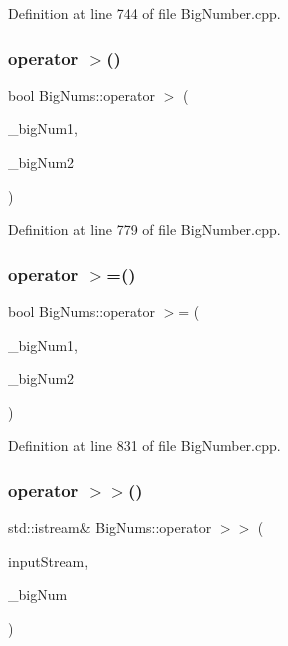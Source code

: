 Definition at line 744 of file Big\+Number.\+cpp.

\mbox{\label{namespace_big_nums_a8da493ab5dba979579d6ceeec7b1ac14}} 
\subsubsection{\texorpdfstring{operator $>$()}{operator >()}}
{\footnotesize\ttfamily bool Big\+Nums\+::operator $>$ (\begin{DoxyParamCaption}\item[{const \mbox{\hyperlink{class_big_nums_1_1_big_number}{Big\+Number}} \&}]{\+\_\+big\+Num1,  }\item[{const \mbox{\hyperlink{class_big_nums_1_1_big_number}{Big\+Number}} \&}]{\+\_\+big\+Num2 }\end{DoxyParamCaption})}



Definition at line 779 of file Big\+Number.\+cpp.

\mbox{\label{namespace_big_nums_afde1be123ae1b999f1913f801d6aa286}} 
\subsubsection{\texorpdfstring{operator $>$=()}{operator >=()}}
{\footnotesize\ttfamily bool Big\+Nums\+::operator $>$= (\begin{DoxyParamCaption}\item[{const \mbox{\hyperlink{class_big_nums_1_1_big_number}{Big\+Number}} \&}]{\+\_\+big\+Num1,  }\item[{const \mbox{\hyperlink{class_big_nums_1_1_big_number}{Big\+Number}} \&}]{\+\_\+big\+Num2 }\end{DoxyParamCaption})}



Definition at line 831 of file Big\+Number.\+cpp.

\mbox{\label{namespace_big_nums_a842a1460ed950581d97b842d8fb42910}} 
\subsubsection{\texorpdfstring{operator $>$$>$()}{operator >>()}\hspace{0.1cm}{\footnotesize\ttfamily [1/2]}}
{\footnotesize\ttfamily std\+::istream\& Big\+Nums\+::operator $>$$>$ (\begin{DoxyParamCaption}\item[{std\+::istream \&}]{input\+Stream,  }\item[{\mbox{\hyperlink{class_big_nums_1_1_big_number}{Big\+Number}} \&}]{\+\_\+big\+Num }\end{DoxyParamCaption})}



